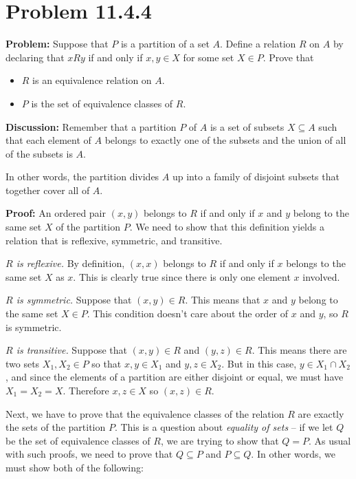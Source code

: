 \documentclass[
]{article}
\author{}
\date{}
\providecommand{\tightlist}{%
  \setlength{\itemsep}{0pt}\setlength{\parskip}{0pt}}
\begin{document}
\hypertarget{problem-11.4.4}{%
\section{Problem 11.4.4}\label{problem-11.4.4}}

\renewcommand{\subset}{\subseteq}

\textbf{Problem:} Suppose that \(P\) is a partition of a set \(A\).
Define a relation \(R\) on \(A\) by declaring that \(xRy\) if and only
if \(x,y\in X\) for some set \(X\in P\). Prove that

\begin{itemize}
\tightlist
\item
  \(R\) is an equivalence relation on \(A\).
\item
  \(P\) is the set of equivalence classes of \(R\).
\end{itemize}

\textbf{Discussion:} Remember that a partition \(P\) of \(A\) is a set
of subsets \(X\subseteq A\) such that each element of \(A\) belongs to
exactly one of the subsets and the union of all of the subsets is \(A\).

In other words, the partition divides \(A\) up into a family of disjoint
subsets that together cover all of \(A\).

\textbf{Proof:} An ordered pair \((x,y)\) belongs to \(R\) if and only
if \(x\) and \(y\) belong to the same set \(X\) of the partition \(P\).
We need to show that this definition yields a relation that is
reflexive, symmetric, and transitive.

\emph{\(R\) is reflexive.} By definition, \((x,x)\) belongs to \(R\) if
and only if \(x\) belongs to the same set \(X\) as \(x\). This is
clearly true since there is only one element \(x\) involved.

\emph{\(R\) is symmetric.} Suppose that \((x,y)\in R\). This means that
\(x\) and \(y\) belong to the same set \(X\in P\). This condition
doesn't care about the order of \(x\) and \(y\), so \(R\) is symmetric.

\emph{\(R\) is transitive.} Suppose that \((x,y)\in R\) and
\((y,z)\in R\). This means there are two sets \(X_1,X_2\in P\) so that
\(x,y\in X_1\) and \(y,z\in X_2\). But in this case,
\(y\in X_1\cap X_2\), and since the elements of a partition are either
disjoint or equal, we must have \(X_1=X_2=X\). Therefore \(x,z\in X\) so
\((x,z)\in R\).

Next, we have to prove that the equivalence classes of the relation
\(R\) are exactly the sets of the partition \(P\). This is a question
about \emph{equality of sets} -- if we let \(Q\) be the set of
equivalence classes of \(R\), we are trying to show that \(Q=P\). As
usual with such proofs, we need to prove that \(Q\subseteq P\) and
\(P\subseteq Q\). In other words, we must show both of the following:
\end{document}
